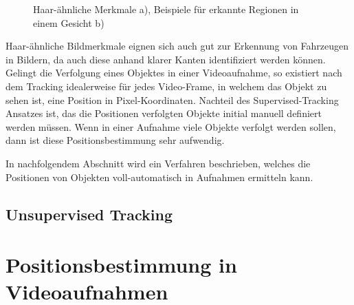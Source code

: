 \begin{figure}[H]
    \centering
    \qquad
    \caption[Haar-ähnliche Merkmale a), Beispiele für erkannte Regionen in einem Gesicht b)]{Haar-ähnliche Merkmale a), Beispiele für erkannte Regionen in einem Gesicht b) \cite[]{DivyanshDwivedi2018}}
    \label{fig:grund_hair_like}
\end{figure}

Haar-ähnliche Bildmerkmale eignen sich auch gut zur Erkennung von Fahrzeugen in Bildern, da auch diese anhand klarer
Kanten identifiziert werden können.
Gelingt die Verfolgung eines Objektes in einer Videoaufnahme, so existiert nach dem Tracking idealerweise
für jedes Video-Frame, in welchem das Objekt zu sehen ist, eine Position in Pixel-Koordinaten.
Nachteil des Supervised-Tracking Ansatzes ist, das die Positionen verfolgten Objekte initial
manuell definiert werden müssen. Wenn in einer Aufnahme viele Objekte verfolgt werden sollen, dann ist
diese Positionsbestimmung sehr aufwendig.

In nachfolgendem Abschnitt wird ein Verfahren beschrieben, welches die Positionen von Objekten voll-automatisch
in Aufnahmen ermitteln kann.

\subsection{Unsupervised Tracking}

\section{Positionsbestimmung in Videoaufnahmen}

